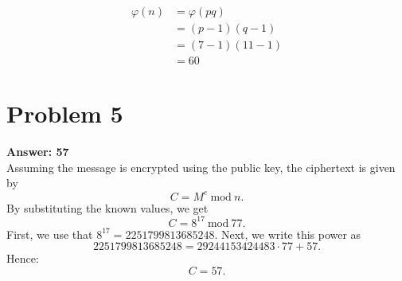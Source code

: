 \documentclass[11pt]{article}
\newcommand{\Mod}{\:\mathrm{mod}\:}
\begin{document}
\begin{align}
\varphi(n)&=\varphi(pq)\\
&=(p-1)(q-1)\\
&=(7-1)(11-1)\\
&=60
\end{align}

\section*{Problem 5}
\label{sec:org4877588}
\textbf{Answer: 57}\\[0pt]

Assuming the message is encrypted using the public key, the ciphertext is given by
\begin{equation}
C=M^e\Mod n.
\end{equation}
By substituting the known values, we get
\begin{equation}
C=8^{17}\Mod 77.
\end{equation}
First, we use that \(8^{17}=2251799813685248\). Next, we write this power as
\begin{equation*}
2251799813685248=29244153424483\cdot 77+57.
\end{equation*}
Hence:
\begin{equation}
C=57.
\end{equation}
\end{document}
